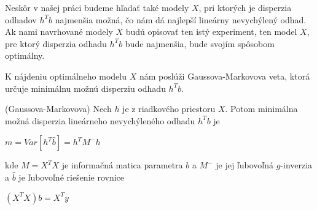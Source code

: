 Neskôr v našej práci budeme hľadať také modely $X$, pri ktorých je disperzia odhadov $h^T b$ najmenšia možná,
čo nám dá najlepší lineárny nevychýlený odhad. 
Ak nami navrhované modely $X$ budú opisovať ten istý experiment, ten model $X$,
pre ktorý disperzia odhadu $h^T b$ bude najmenšia, bude svojím spôsobom optimálny.

K nájdeniu optimálneho modelu $X$ nám poslúži Gaussova-Markovova veta, 
ktorá určuje minimálnu možnú disperziu odhadu $h^T b$.

\begin{theorem}
\label{gauss-markov}
(Gaussova-Markovova) Nech $h$ je z riadkového priestoru $X$. 
Potom minimálna možná disperzia lineárneho nevychýleného odhadu $h^T b$ je

\begin{center}
$
m = Var[h^T \hat{b}] = h^T M^- h
$
\end{center}

kde $M = X^T X$ je informačná matica parametra $b$ a $M^-$ je jej ľubovoľná $g$-inverzia
a $\hat{b}$ je ľubovoľné riešenie rovnice

\begin{center}
$
(X^T X)b = X^T y
$
\end{center}
\end{theorem}